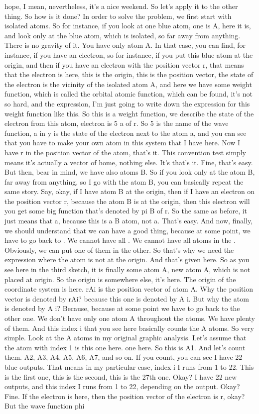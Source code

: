 hope, I mean, nevertheless, it's a nice weekend. So let's apply it to the other thing. So how is it done? In order to solve the problem, we first start with isolated atoms. So for instance, if you look at one blue atom, one is A, here it is, and look only at the blue atom, which is isolated, so far away from anything. There is no gravity of it. You have only atom A. In that case, you can find, for instance, if you have an electron, so for instance, if you put this blue atom at the origin, and then if you have an electron with the position vector r, that means that the electron is here, this is the origin, this is the position vector, the state of the electron is the vicinity of the isolated atom A, and here we have some weight function, which is called the orbital atomic function, which can be found, it's not so hard, and the expression, I'm just going to write down the expression for this weight function like this. So this is a weight function, we describe the state of the electron from this atom, electron is 5 a of r. So 5 is the name of the wave function, a in y is the state of the electron next to the atom a, and you can see that you have to make your own atom in this system that I have here. Now I have r in the position vector of the atom, that's it. This convention test simply means it's actually a vector of home, nothing else. It's that's it. Fine, that's easy. But then, bear in mind, we have also atoms B. So if you look only at the atom B, far away from anything, so I go with the atom B, you can basically repeat the same story. Say, okay, if I have atom B at the origin, then if I have an electron on the position vector r, because the atom B is at the origin, then this electron will you get some big function that's denoted by pi B of r. So the same as before, it just means that a, because this is a B atom, not a. That's easy. And now, finally, we should understand that we can have a good thing, because at some point, we have to go back to . We cannot have all . We cannot have all atoms in the . Obviously, we can put one of them in the other. So that's why we need the expression where the atom is not at the origin. And that's given here. So as you see here in the third sketch, it is finally some atom A, new atom A, which is not placed at origin. So the origin is somewhere else, it's here. The origin of the coordinate system is here. rAi is the position vector of atom A. Why the position vector is denoted by rAi? because this one is denoted by A i. But why the atom is denoted by A i? Because, because at some point we have to go back to the other one. We don't have only one atom A throughout the atoms. We have plenty of them. And this index i that you see here basically counts the A atoms. So very simple. Look at the A atoms in my original graphic analysis. Let's assume that the atom with index 1 is this one here. one here. So this is A1. And let's count them. A2, A3, A4, A5, A6, A7, and so on. If you count, you can see I have 22 blue outputs. That means in my particular case, index i I runs from 1 to 22. This is the first one, this is the second, this is the 27th one. Okay? I have 22 new outputs, and this index I runs from 1 to 22, depending on the output. Okay? Fine. If the electron is here, then the position vector of the electron is r, okay? But the wave function phi 